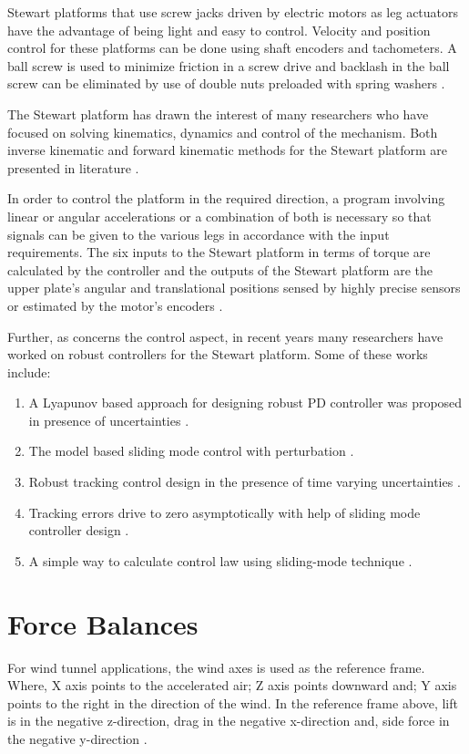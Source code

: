 Stewart platforms that use screw jacks driven by electric motors as leg actuators have the advantage of being light and easy to control. Velocity and position control for these platforms can be done using shaft encoders and tachometers. A ball screw is used to minimize friction in a screw drive and backlash in the ball screw can be eliminated by use of double nuts preloaded with spring washers \cite{fichter1986stewart}.

The Stewart platform has drawn the interest of many researchers who have focused on solving kinematics, dynamics and control of the mechanism. Both inverse kinematic and forward kinematic methods for the Stewart platform are presented in literature
\cite{csumnu2017simulation}.

In order to control the platform in the required direction, a program involving linear or angular accelerations or a combination of both is necessary so that signals can be given to the various legs in accordance with the input requirements. The six inputs to the Stewart platform in terms of torque are calculated by the controller and the outputs of the Stewart platform are the upper plate's angular and translational positions sensed by highly precise sensors or estimated by the motor's encoders \cite{iqbal_dynamic_2008}.

Further, as concerns the control aspect, in recent years many researchers have worked on robust controllers for the Stewart platform. Some of these works include:
\begin{enumerate}
\item A Lyapunov based approach for designing robust PD controller was proposed in presence of uncertainties 
\cite{kang1996robust}.
\item The model based sliding mode control with perturbation 
\cite{kang1996robust}.
\item Robust tracking control design in the presence of time varying
uncertainties 
\cite{kim1998high}.
\item Tracking errors drive to zero asymptotically with help of sliding mode
controller design 
\cite{huang2004sliding}.
\item A simple way to calculate control law using sliding-mode technique 
\cite{iqbal2006direct}.
\end{enumerate}

\section{Force Balances}
For wind tunnel applications, the wind axes is used as the reference frame. Where, X axis points to the accelerated air; Z axis points downward and; Y axis points to the right in the direction of the wind. In the reference frame above, lift is in the negative z-direction, drag in the negative x-direction and, side force in the negative y-direction \cite{bueno2018design}.

